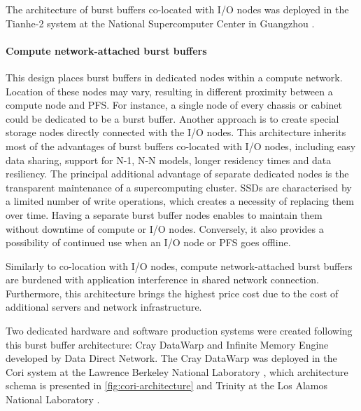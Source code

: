 \documentclass[thesis-en.tex]{subfiles}
\begin{document}
The architecture of burst buffers co-located with I/O nodes was deployed in the Tianhe-2 system at the National Supercomputer Center in Guangzhou \cite{tianhe}.


\paragraph{Compute network-attached burst buffers}
This design places burst buffers in dedicated nodes within a compute network. Location of these nodes may vary, resulting in different proximity between a compute node and PFS. For instance, a single node of every chassis or cabinet could be dedicated to be a burst buffer. Another approach is to create special storage nodes directly connected with the I/O nodes. This architecture inherits most of the advantages of burst buffers co-located with I/O nodes, including easy data sharing, support for N-1, N-N models, longer residency times and data resiliency. The principal additional advantage of separate dedicated nodes is the transparent maintenance of a supercomputing cluster. SSDs are characterised by a limited number of write operations, which creates a necessity of replacing them over time. Having a separate burst buffer nodes enables to maintain them without downtime of compute or I/O nodes. Conversely, it also provides a possibility of continued use when an I/O node or PFS goes offline. 

Similarly to co-location with I/O nodes, compute network-attached burst buffers are burdened with application interference in shared network connection. Furthermore, this architecture brings the highest price cost due to the cost of additional servers and network infrastructure.

Two dedicated hardware and software production systems were created following this burst buffer architecture: Cray DataWarp and Infinite Memory Engine developed by Data Direct Network. The Cray DataWarp was deployed in the Cori system at the Lawrence Berkeley National Laboratory \cite{cori-exp, bhimji2016accelerating, Bhimji_2017}, which architecture schema is presented in \autoref{fig:cori-architecture} and Trinity at the Los Alamos National Laboratory \cite{trinity,osti_1367056}.
\end{document}
